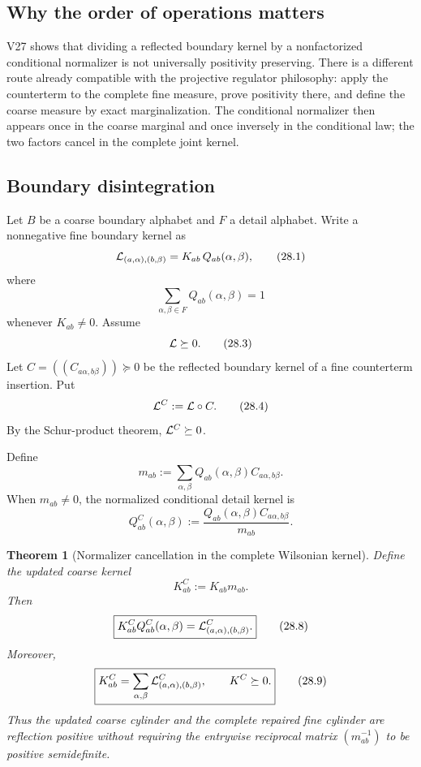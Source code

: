 \documentclass[11pt]{article}
\newtheorem{theorem}{Theorem}[section]
\theoremstyle{remark}
\begin{document}
\subsection{Why the order of operations matters}

V27 shows that dividing a reflected boundary kernel by a nonfactorized
conditional normalizer is not universally positivity preserving.
There is a different route already compatible with the projective
regulator philosophy: apply the counterterm to the complete fine
measure, prove positivity there, and define the coarse measure by
exact marginalization.  The conditional normalizer then appears once
in the coarse marginal and once inversely in the conditional law;
the two factors cancel in the complete joint kernel.

\subsection{Boundary disintegration}

Let \(B\) be a coarse boundary alphabet and \(F\) a detail alphabet.
Write a nonnegative fine boundary kernel as
\[
 {\cal L}_{(a,\alpha),(b,\beta)}
 =
 K_{ab}\,Q_{ab}(\alpha,\beta),                             \tag{28.1}
\]
where
\[
                         \sum_{\alpha,\beta\in F}
 Q_{ab}(\alpha,\beta)=1                                    \tag{28.2}
\]
whenever \(K_{ab}\ne0\).  Assume
\[
                         {\cal L}\succeq0.                  \tag{28.3}
\]
Let \(C=((C_{a\alpha,b\beta}))\succeq0\) be the reflected boundary
kernel of a fine counterterm insertion.  Put
\[
 {\cal L}^C:={\cal L}\circ C.                              \tag{28.4}
\]
By the Schur-product theorem, \({\cal L}^C\succeq0\).

Define
\[
 m_{ab}:=
 \sum_{\alpha,\beta}
 Q_{ab}(\alpha,\beta)C_{a\alpha,b\beta}.                   \tag{28.5}
\]
When \(m_{ab}\ne0\), the normalized conditional detail kernel is
\[
 Q^C_{ab}(\alpha,\beta)
 :=
 \frac{
 Q_{ab}(\alpha,\beta)C_{a\alpha,b\beta}}
 {m_{ab}}.                                                  \tag{28.6}
\]

\begin{theorem}[Normalizer cancellation in the complete Wilsonian
kernel]
\label{thm:v12v28-cancel}
Define the updated coarse kernel
\[
                         K^C_{ab}:=K_{ab}m_{ab}.             \tag{28.7}
\]
Then
\[
 \boxed{
 K^C_{ab}Q^C_{ab}(\alpha,\beta)
 =
 {\cal L}^C_{(a,\alpha),(b,\beta)}.}                        \tag{28.8}
\]
Moreover,
\[
 \boxed{
 K^C_{ab}
 =
 \sum_{\alpha,\beta}
 {\cal L}^C_{(a,\alpha),(b,\beta)},\qquad K^C\succeq0.}     \tag{28.9}
\]
Thus the updated coarse cylinder and the complete repaired fine
cylinder are reflection positive without requiring the entrywise
reciprocal matrix \((m_{ab}^{-1})\) to be positive semidefinite.
\end{theorem}
\end{document}
